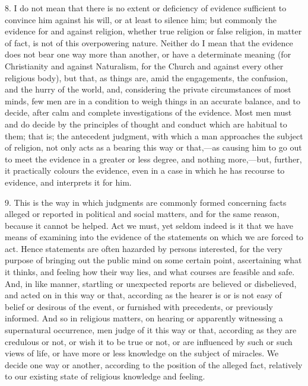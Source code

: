 8. I do not mean that there is no extent or deficiency of evidence
sufficient to convince him against his will, or at least to silence
him; but commonly the evidence for and against religion, whether true
religion or false religion, in matter of fact, is not of this
overpowering nature. Neither do I mean that the evidence does not bear
one way more than another, or have a determinate meaning (for
Christianity and against Naturalism, for the Church and against every
other religious body), but that, as things are, amid the engagements,
the confusion, and the hurry of the world, and, considering the
private circumstances of most minds, few men are in a condition to
weigh things in an accurate balance, and to decide, after calm and
complete investigations of the evidence. Most men must and do decide
by the principles of thought and conduct which are habitual to them;
that is; the antecedent judgment, with which a man approaches the
subject of religion, not only acts as a bearing this way or that,—as
causing him to go out to meet the evidence in a greater or less
degree, and nothing more,—but, further, it practically colours the
evidence, even in a case in which he has recourse to evidence, and
interprets it for him.

9. This is the way in which judgments are commonly formed
concerning facts alleged or reported in political and social matters,
and for the same reason, because it cannot be helped. Act we must, yet
seldom indeed is it that we have means of examining into the evidence
of the statements on which we are forced to act. Hence statements are
often hazarded by persons interested, for the very purpose of bringing
out the public mind on some certain point, ascertaining what it
thinks, and feeling how their way lies, and what courses are feasible
and safe. And, in like manner, startling or unexpected reports are
believed or disbelieved, and acted on in this way or that, according
as the hearer is or is not easy of belief or desirous of the event, or
furnished with precedents, or previously informed. And so in religious
matters, on hearing or apparently witnessing a supernatural
occurrence, men judge of it this way or that, according as they are
credulous or not, or wish it to be true or not, or are influenced by
such or such views of life, or have more or less knowledge on the
subject of miracles. We decide one way or another, according to the
position of the alleged fact, relatively to our existing state of
religious knowledge and feeling.

